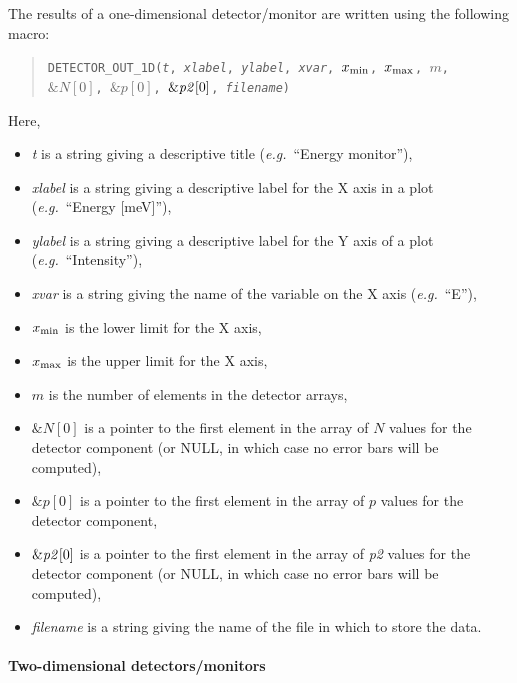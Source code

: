 The results of a one-dimensional detector/\discretionary{}{}{}mon\-i\-tor are written using the
following macro:
\begin{quote}
  \texttt{DETECTOR\_OUT\_1D({\it t},
        {\it xlabel},
        {\it ylabel},
        {\it xvar}, $x_{\rm min}$, $x_{\rm max}$, $m$, \\
          $\&N[0]$, $\&p[0]$, $\&{\it p2}[0]$,
        {\it filename})}
\end{quote}
Here,
\begin{itemize}
\item \textit{t} is a string giving a descriptive title ({\em e.g.}\ ``Energy
  monitor''),
\item \textit{xlabel} is a string giving a descriptive label for the X
  axis in a plot ({\em e.g.}\ ``Energy [meV]''),
\item \textit{ylabel} is a string giving a descriptive label for the Y
  axis of a plot ({\em e.g.}\ ``Intensity''),
\item \textit{xvar} is a string giving the name of the variable on the X
  axis ({\em e.g.}\ ``E''),
\item $x_{\rm min}$ is the lower limit for the X axis,
\item $x_{\rm max}$ is the upper limit for the X axis,
\item $m$ is the number of elements in the detector arrays,
\item $\&N[0]$ is a pointer to the first element in the array of $N$
  values for the detector component (or NULL, in which case no error
  bars will be computed),
\item $\&p[0]$ is a pointer to the first element in the array of $p$
  values for the detector component,
\item $\&{\it p2}[0]$ is a pointer to the first element in the array of
  {\it p2} values for the detector component (or NULL, in which case no error
  bars will be computed),
\item \textit{filename} is a string giving the name of the file in which
  to store the data.
\end{itemize}


\paragraph{Two-dimensional detectors/monitors}

